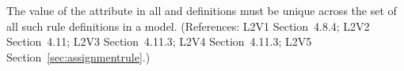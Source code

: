 The value of the  attribute in all \AssignmentRule and
\RateRule definitions must be unique across the set of all such rule
definitions in a model.  (References: L2V1 Section~4.8.4; 
L2V2 Section~4.11; L2V3 Section~4.11.3; L2V4 Section~4.11.3; L2V5 Section~\ref{sec:assignmentrule}.)
